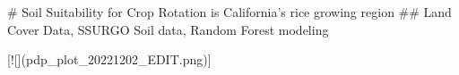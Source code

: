 # Soil Suitability for Crop Rotation is California's rice growing region  
## Land Cover Data, SSURGO Soil data, Random Forest modeling  




[![](pdp_plot_20221202_EDIT.png)]